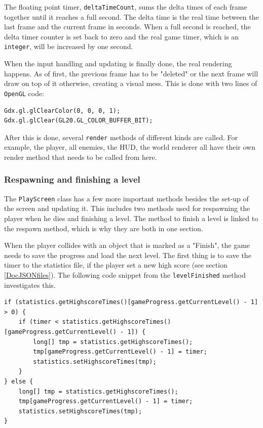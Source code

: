 \documentclass[12p]{article}
\begin{document}
The floating point timer, \texttt{deltaTimeCount}, sums the delta times of each frame together until it reaches a full second. The delta time is the real time between the last frame and the current frame in seconds. When a full second is reached, the delta timer counter is set back to zero and the real game timer, which is an \texttt{integer}, will be increased by one second.

When the input handling and updating is finally done, the real rendering happens. As of first, the previous frame has to be "deleted" or the next frame will draw on top of it otherwise, creating a visual mess. This is done with two lines of \texttt{OpenGL} code:

\begin{verbatim}
Gdx.gl.glClearColor(0, 0, 0, 1);
Gdx.gl.glClear(GL20.GL_COLOR_BUFFER_BIT);
\end{verbatim}

After this is done, several \texttt{render} methods of different kinds are called. For example, the player, all enemies, the HUD, the world renderer all have their own render method that needs to be called from here.

\subsubsection{Respawning and finishing a level}

The \texttt{PlayScreen} class has a few more important methods besides the set-up of the screen and updating it. This includes two methods used for respawning the player when he dies and finishing a level. The method to finish a level is linked to the respawn method, which is why they are both in one section.

When the player collides with an object that is marked as a "Finish", the game needs to save the progress and load the next level. The first thing is to save the timer to the statistics file, if the player set a new high score (see section \ref{DocJSONfiles}). The following code snippet from the \texttt{levelFinished} method investigates this.

\begin{verbatim}
if (statistics.getHighscoreTimes()[gameProgress.getCurrentLevel() - 1] > 0) {
    if (timer < statistics.getHighscoreTimes()[gameProgress.getCurrentLevel() - 1]) {
        long[] tmp = statistics.getHighscoreTimes();
        tmp[gameProgress.getCurrentLevel() - 1] = timer;
        statistics.setHighscoreTimes(tmp);
    }
} else {
    long[] tmp = statistics.getHighscoreTimes();
    tmp[gameProgress.getCurrentLevel() - 1] = timer;
    statistics.setHighscoreTimes(tmp);
}
\end{verbatim}
\end{document}
